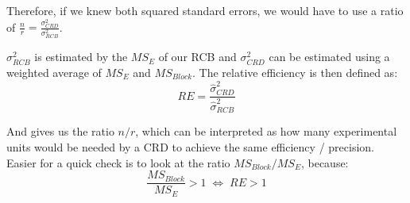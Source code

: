 Therefore, if we knew both squared standard errors, we would have to use a ratio of $\frac{n}{r} = \frac{\sigma_{CRD}^2}{\sigma_{RCB}^2}$. \medskip

$\sigma_{RCB}^2$ is estimated by the $MS_E$ of our RCB and $\sigma_{CRD}^2$ can be estimated using a weighted average of $MS_E$ and $MS_{Block}$. The relative efficiency is then defined as:
$$RE = \frac{\hat \sigma_{CRD}^2}{\hat \sigma_{RCB}^2}$$

And gives us the ratio $n / r$, which can be interpreted as how many experimental units would be needed by a CRD to achieve the same efficiency / precision. Easier for a quick check is to look at the ratio $MS_{Block} / MS_E$, because:
$$\frac{MS_{Block}}{MS_E} > 1 \; \Leftrightarrow \; RE > 1$$
